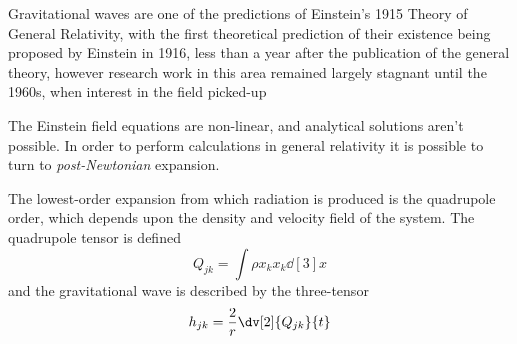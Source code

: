 Gravitational waves are one of the predictions of Einstein's 1915
Theory of General Relativity\cite{1915SPAW.......844E}, with the first
theoretical prediction of their existence being proposed by Einstein
in 1916\cite{1937FrInJ.223...43E,1918SPAW.......154E}, less than a
year after the publication of the general theory, however research
work in this area remained largely stagnant until the 1960s, when
interest in the field picked-up


The Einstein field equations are non-linear, and analytical solutions
aren't possible. In order to perform calculations in general
relativity it is possible to turn to  \emph{post-Newtonian} expansion. 

The lowest-order expansion from which radiation is produced is the
quadrupole order, which depends upon the density and velocity field of
the system. The quadrupole tensor is defined
\begin{equation}
  \label{eq:1}
  Q_{jk} = \int \rho x_k x_k \dd[3]{x}
\end{equation}
and the gravitational wave is described by the three-tensor
\begin{equation}
  \label{eq:2}
  h_{jk} = \frac{2}{r} \dv[2]{Q_{jk}}{t}
\end{equation}


